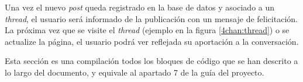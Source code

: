 \documentclass[12pt,a4paper,titlepage]{article}
\begin{document}
    

    Una vez el nuevo \textit{post} queda registrado en la base de datos y asociado a un \textit{thread}, el usuario será informado de la publicación con un mensaje de felicitación. La próxima vez que se visite el \textit{thread} (ejemplo en la figura \ref{4chan:thread}) o se actualize la página, el usuario podrá ver reflejada su aportación a la conversación.

    \newpage

    \lstlistoflistings\bigskip

    Esta sección es una compilación todos los bloques de código que se han descrito a lo largo del documento, y equivale al apartado 7 de la guía del proyecto.

    \newpage

    \printbibliography
\end{document}

